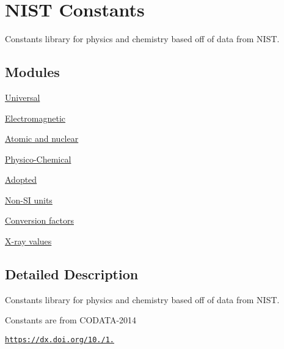 \hypertarget{group___n_i_s_t_const}{}\section{N\+I\+ST Constants}
\label{group___n_i_s_t_const}


Constants library for physics and chemistry based off of data from N\+I\+ST.  


\subsection*{Modules}
\begin{DoxyCompactItemize}
\item 
\hyperlink{group___n_i_s_t_const-_universal}{Universal}
\item 
\hyperlink{group___n_i_s_t_const-_electromagnetic}{Electromagnetic}
\item 
\hyperlink{group___n_i_s_t_const-_atomic}{Atomic and nuclear}
\item 
\hyperlink{group___n_i_s_t_const-_physico_chemical}{Physico-\/\+Chemical}
\item 
\hyperlink{group___n_i_s_t_const-_adopted}{Adopted}
\item 
\hyperlink{group___n_i_s_t_const-_non-_s_i}{Non-\/\+S\+I units}
\item 
\hyperlink{group___n_i_s_t_const-_conversion_factors}{Conversion factors}
\item 
\hyperlink{group___n_i_s_t_const-_x-ray}{X-\/ray values}
\end{DoxyCompactItemize}


\subsection{Detailed Description}
Constants library for physics and chemistry based off of data from N\+I\+ST. 

Constants are from C\+O\+D\+A\+T\+A-\/2014

\href{https://dx.doi.org/10.1063/1.4954402}{\tt https\+://dx.\+doi.\+org/10./1.} 